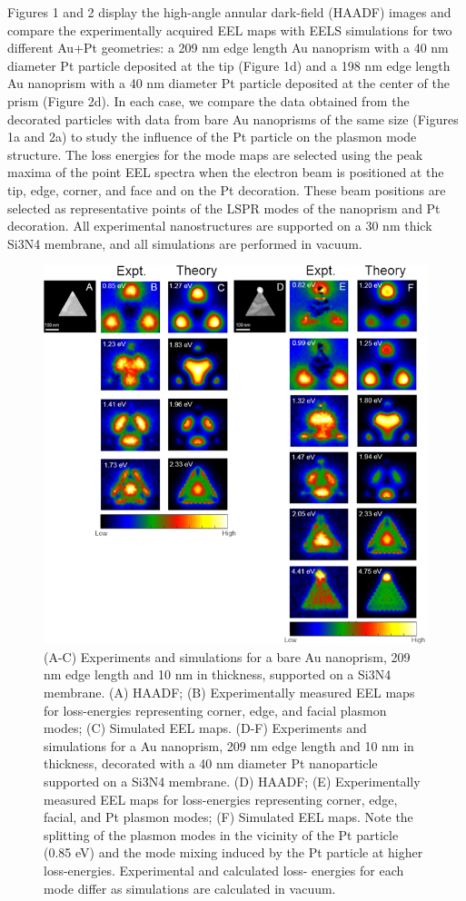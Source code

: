 \documentclass [11pt, proquest] {uwthesis}[2016/11/22]
\begin{document}
Figures 1 and 2 display the high-angle annular dark-field (HAADF) images and compare the experimentally acquired EEL maps with EELS simulations for two different Au+Pt geometries: a 209 nm edge length Au nanoprism with a 40 nm diameter Pt particle deposited at the tip (Figure 1d) and a 198 nm edge length Au nanoprism with a 40 nm diameter Pt particle deposited at the center of the prism (Figure 2d). In each case, we compare the data obtained from the decorated particles with data from bare Au nanoprisms of the same size (Figures 1a and 2a) to study the influence of the Pt particle on the plasmon mode structure. The loss energies for the mode maps are selected using the peak maxima of the point EEL spectra when the electron beam is positioned at the tip, edge, corner, and face and on the Pt decoration. These beam positions are selected as representative points of the LSPR modes of the nanoprism and Pt decoration. All experimental nanostructures are supported on a 30 nm thick Si3N4 membrane, and all simulations are performed in vacuum.

\begin{figure}
\includegraphics{prisms_mode_maps_tip.png}
\caption{(A-C) Experiments and simulations for a bare Au nanoprism, 209 nm edge length and 10 nm in thickness, supported on a Si3N4 membrane. (A) HAADF; (B) Experimentally measured EEL maps for loss-energies representing corner, edge, and facial plasmon modes; (C) Simulated EEL maps. (D-F) Experiments and simulations for a Au nanoprism, 209 nm edge length and 10 nm in thickness, decorated with a 40 nm diameter Pt nanoparticle supported on a Si3N4 membrane. (D) HAADF; (E) Experimentally measured EEL maps for loss-energies representing corner, edge, facial, and Pt plasmon modes; (F) Simulated EEL maps. Note the splitting of the plasmon modes in the vicinity of the Pt particle (0.85 eV) and the mode mixing induced by the Pt particle at higher loss-energies. Experimental and calculated loss- energies for each mode differ as simulations are calculated in vacuum.}
\label{modes_tip}
\end{figure}
\end{document}
